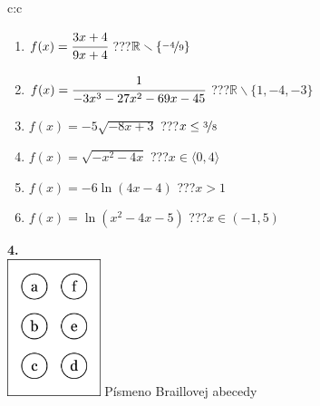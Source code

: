 \documentclass[10pt]{report}
\begin{document}
\begin{tabular}{c:c}
\begin{minipage}[c][104.5mm][t]{0.5\linewidth}
\begin{center}
\begin{minipage}{0.79\linewidth}
\begin{center}
\begin{varwidth}{\linewidth}
\begin{enumerate}
\normalsizerrr
\item $f(x)=\cfrac{3x+4}{9x+4}$\quad \dotfill\; ???\;\dotfill \quad $\mathbb{R}\smallsetminus\{\nicefrac{-4}{9}\}$
\item $f(x)=\cfrac{1}{-3x^3-27x^2-69x-45}$\quad \dotfill\; ???\;\dotfill \quad $\mathbb{R}\smallsetminus\{1,-4,-3\}$
\item $f(x)=-5\sqrt{-8x+3}$\quad \dotfill\; ???\;\dotfill \quad $x\leq\nicefrac{3}{8}$
\item $f(x)=\sqrt{-x^2-4x}$\quad \dotfill\; ???\;\dotfill \quad $x\in\langle0 , 4\rangle$
\item $f(x)=-6\ln{(4x-4)}$\quad \dotfill\; ???\;\dotfill \quad $x>1$
\item $f(x)=\ln{(x^2-4x-5)}$\quad \dotfill\; ???\;\dotfill \quad $x\in(-1 , 5)$
\end{enumerate}
\end{varwidth}
\end{center}
\end{minipage}
\begin{minipage}{0.20\linewidth}
\begin{center}
{\Huge\bfseries 4.} \\[2mm]
\includegraphics[height=40mm]{../images/braille.png}
{\small Písmeno Braillovej abecedy}
\end{center}
\end{minipage}
\end{center}
\end{minipage}
%
\end{tabular}
\newpage
\thispagestyle{empty}
\end{document}
